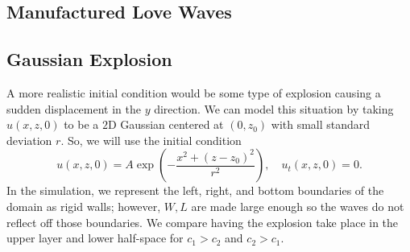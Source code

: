 \documentclass[11pt,letter,subeqn,fleqn]{article}
\numberwithin{equation}{section}
\numberwithin{table}{section}
\numberwithin{figure}{section}
\begin{document}
\subsection{Manufactured Love Waves}
\label{sec:numerical_manufactured}


%
%
%
%





\subsection{Gaussian Explosion}
A more realistic initial condition would be some type of explosion causing a sudden displacement in the $y$
direction. We can model this situation by taking $u(x,z,0)$ to be a $2$D Gaussian centered at $(0,z_0)$ with
small standard deviation $r$. So, we will use the initial condition
\[
	u(x,z,0) = A\exp\left(-\frac{x^2+(z-z_0)^2}{r^2}\right), \quad u_t(x,z,0) = 0.
\]
In the simulation, we represent the left, right, and bottom boundaries of the domain as rigid walls; however,
$W,L$ are made large enough so the waves do not reflect off those boundaries. We compare having the explosion
take place in the upper layer and lower half-space for $c_1>c_2$ and $c_2>c_1$. 
\end{document}
